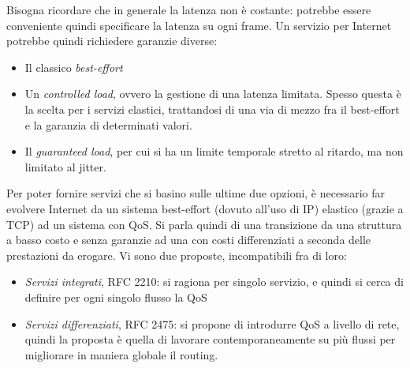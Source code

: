 Bisogna ricordare che in generale la latenza non è costante: potrebbe essere conveniente quindi specificare la latenza
su ogni frame. Un servizio per Internet potrebbe quindi richiedere garanzie diverse:
\begin{itemize}
 \item Il classico \textit{best-effort}
 \item Un \textit{controlled load}, ovvero la gestione di una latenza limitata. Spesso questa è la scelta per i 
 servizi elastici, trattandosi di una via di mezzo fra il best-effort e la garanzia di determinati valori.
 \item Il \textit{guaranteed load}, per cui si ha un limite temporale stretto al ritardo, ma non limitato al jitter.
\end{itemize}
Per poter fornire servizi che si basino sulle ultime due opzioni, è necessario far evolvere Internet da un sistema
best-effort (dovuto all'uso di IP) elastico (grazie a TCP) ad un sistema con QoS. Si parla quindi di una transizione
da una struttura a basso costo e senza garanzie ad una con costi differenziati a seconda delle prestazioni da erogare. 
Vi sono due proposte, incompatibili fra di loro:
\begin{itemize}
 \item \textit{Servizi integrati}, RFC 2210: si ragiona per singolo servizio, e quindi si cerca di definire per ogni
 singolo flusso la QoS
 \item \textit{Servizi differenziati}, RFC 2475: si propone di introdurre QoS a livello di rete, quindi la proposta è
 quella di lavorare contemporaneamente su più flussi per migliorare in maniera globale il routing.
\end{itemize}

